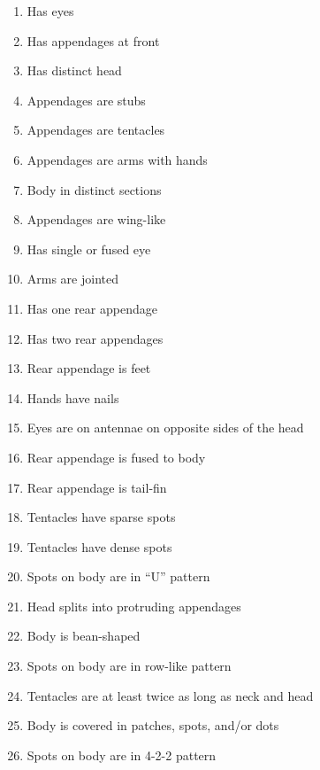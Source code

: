 \documentclass{article}
\makeatletter
\def\enumalphalphcnt#1{\expandafter\@enumalphalphcnt\csname c@#1\endcsname}
\def\@enumalphalphcnt#1{\alphalph{#1}}
\makeatother
\begin{document}
            \begin{multicols}{2}
                \begin{enumerate}[label=\textbf{\enumalphalphcnt*.}]
                    \item Has eyes
                    \item Has appendages at front
                    \item Has distinct head
                    \item Appendages are stubs
                    \item Appendages are tentacles
                    \item Appendages are arms with hands
                    \item Body in distinct sections
                    \item Appendages are wing-like
                    \item Has single or fused eye
                    \item Arms are jointed
                    \item Has one rear appendage
                    \item Has two rear appendages
                    \item Rear appendage is feet
                    \item Hands have nails
                    \item Eyes are on antennae on opposite sides of the head
                    \item Rear appendage is fused to body
                    \item Rear appendage is tail-fin
                    \item Tentacles have sparse spots
                    \item Tentacles have dense spots
                    \item Spots on body are in \enquote{U} pattern
                    \item Head splits into protruding appendages
                    \item Body is bean-shaped
                    \item Spots on body are in row-like pattern
                    \item Tentacles are at least twice as long as neck and head
                    \item Body is covered in patches, spots, and/or dots
                    \item Spots on body are in 4-2-2 pattern

\end{enumerate}
\end{multicols}
\end{document}
